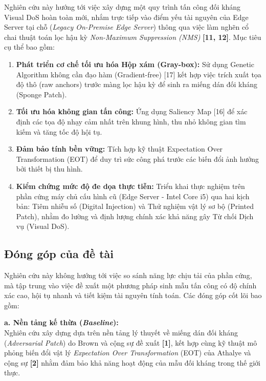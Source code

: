 \documentclass[a4paper,fleqn]{cas-dc}
\begin{document}
Nghiên cứu này hướng tới việc xây dựng một quy trình tấn công đối kháng
Visual DoS hoàn toàn mới, nhắm trực tiếp vào điểm yếu tài nguyên của
Edge Server tại chỗ (\emph{Legacy On-Premise Edge Server}) thông qua
việc làm nghẽn cổ chai thuật toán lọc hậu kỳ \emph{Non-Maximum
Suppression (NMS)} \textbf{{[}11, 12{]}}. Mục tiêu cụ thể bao gồm:

\begin{enumerate}
\def\labelenumi{\arabic{enumi}.}
\item
  \textbf{Phát triển cơ chế tối ưu hóa Hộp xám (Gray-box):} Sử dụng
  Genetic Algorithm không cần đạo hàm (Gradient-free) {[}17{]} kết hợp
  việc trích xuất tọa độ thô (raw anchors) trước màng lọc hậu kỳ để sinh
  ra miếng dán đối kháng (Sponge Patch).
\item
  \textbf{Tối ưu hóa không gian tấn công:} Ứng dụng Saliency Map
  {[}16{]} để xác định các tọa độ nhạy cảm nhất trên khung hình, thu nhỏ
  không gian tìm kiếm và tăng tốc độ hội tụ.
\item
  \textbf{Đảm bảo tính bền vững:} Tích hợp kỹ thuật Expectation Over
  Transformation (EOT) để duy trì sức công phá trước các biến đổi ảnh
  hưởng bởi thiết bị thu hình.
\item
  \textbf{Kiểm chứng mức độ đe dọa thực tiễn:} Triển khai thực nghiệm
  trên phần cứng máy chủ cấu hình cũ (Edge Server - Intel Core i5) qua
  hai kịch bản: Tiêm nhiễu số (Digital Injection) và Thử nghiệm vật lý
  sơ bộ (Printed Patch), nhằm đo lường và định lượng chính xác khả năng
  gây Từ chối Dịch vụ (Visual DoS).
\end{enumerate}

\subsection{Đóng góp của đề tài}

Nghiên cứu này không hướng tới việc so sánh năng lực chịu tải của phần
cứng, mà tập trung vào việc đề xuất một phương pháp sinh mẫu tấn công có
độ chính xác cao, hội tụ nhanh và tiết kiệm tài nguyên tính toán. Các
đóng góp cốt lõi bao gồm:

\textbf{a. Nền tảng kế thừa (\emph{Baseline}):}\\
Nghiên cứu xây dựng dựa trên nền tảng lý thuyết về miếng dán đối kháng
(\emph{Adversarial Patch}) do Brown và cộng sự đề xuất
\textbf{{[}1{]}}, kết hợp cùng kỹ thuật mô phỏng biến
đổi vật lý \emph{Expectation Over Transformation} (EOT) của Athalye và
cộng sự \textbf{{[}2{]}} nhằm đảm bảo khả năng hoạt động
của mẫu đối kháng trong thế giới thực.
\end{document}
